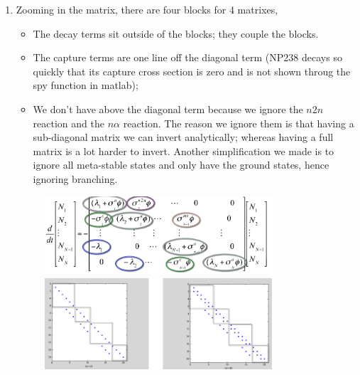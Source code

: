 \documentclass{school-22.211-notes}
\begin{document}
\begin{enumerate}
\clearpage
\item Zooming in the matrix, there are four blocks for 4 matrixes, 
  \begin{itemize}
  \item The decay terms sit outside of the blocks; they couple the blocks.
  \item  The capture terms are one line off the diagonal term (NP238 decays so quickly that its capture cross section is zero and is not shown throug the spy function in matlab); 
  \item We don't have above the diagonal term because we ignore the $n2n$ reaction and the $n \alpha$ reaction. The reason we ignore them is that having a sub-diagonal matrix we can invert analytically; whereas having a full matrix is a lot harder to invert. Another simplification we made is to ignore all meta-stable states and only have the ground states, hence ignoring branching. 
  \end{itemize}
 \begin{figure}[ht]
  \centering
  \includegraphics[width=0.8\textwidth]{images/dfs/nuclide-depletion-matrix-form.png}
  \includegraphics[width=0.8\textwidth]{images/dfs/actinide-block.png}
  \end{figure}




\end{enumerate}
\end{document}
